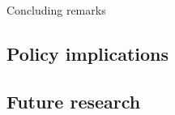 Concluding remarks

\subsection{Policy implications}
\label{sec:policy-implications}

\subsection{Future research}
\label{sec:future-research}


